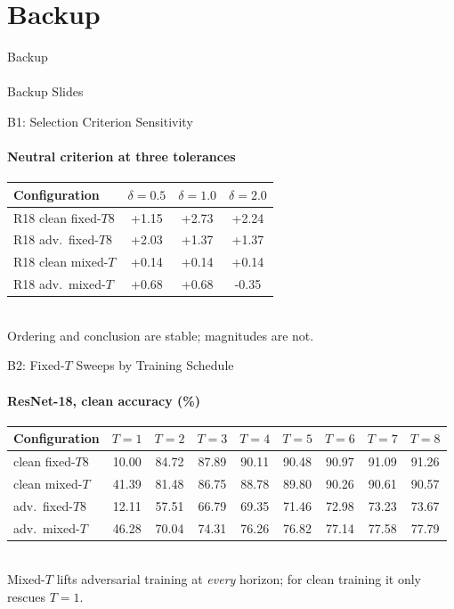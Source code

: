 \documentclass[aspectratio=169,11pt]{beamer}
\begin{document}
\section{Backup}
\begin{frame}{Backup}\framesubtitle{}\centering\Large Backup Slides\end{frame}

\begin{frame}{B1: Selection Criterion Sensitivity}\framesubtitle{Neutral criterion at three tolerances}
\centering\small
\begin{tabular}{lS[table-format=+1.2]S[table-format=+1.2]S[table-format=+1.2]}
\toprule
Configuration & {$\delta=0.5$} & {$\delta=1.0$} & {$\delta=2.0$} \\
\midrule
R18 clean fixed-$T8$ & +1.15 & +2.73 & +2.24 \\
R18 adv.\ fixed-$T8$ & +2.03 & +1.37 & +1.37 \\
R18 clean mixed-$T$  & +0.14 & +0.14 & +0.14 \\
R18 adv.\ mixed-$T$  & +0.68 & +0.68 & -0.35 \\
\bottomrule
\end{tabular}
\\\vspace{0.4em}
\small Ordering and conclusion are stable; magnitudes are not.
\end{frame}

\begin{frame}{B2: Fixed-$T$ Sweeps by Training Schedule}\framesubtitle{ResNet-18, clean accuracy (\%)}
\centering\scriptsize
\begin{tabular}{lcccccccc}
\toprule
Configuration & $T{=}1$ & $T{=}2$ & $T{=}3$ & $T{=}4$ & $T{=}5$ & $T{=}6$ & $T{=}7$ & $T{=}8$ \\
\midrule
clean fixed-$T8$ & 10.00 & 84.72 & 87.89 & 90.11 & 90.48 & 90.97 & 91.09 & 91.26 \\
clean mixed-$T$  & 41.39 & 81.48 & 86.75 & 88.78 & 89.80 & 90.26 & 90.61 & 90.57 \\
adv.\ fixed-$T8$ & 12.11 & 57.51 & 66.79 & 69.35 & 71.46 & 72.98 & 73.23 & 73.67 \\
adv.\ mixed-$T$  & 46.28 & 70.04 & 74.31 & 76.26 & 76.82 & 77.14 & 77.58 & 77.79 \\
\bottomrule
\end{tabular}
\\\vspace{0.4em}
\small Mixed-$T$ lifts adversarial training at \emph{every} horizon; for clean training
it only rescues $T=1$.
\end{frame}
\end{document}
